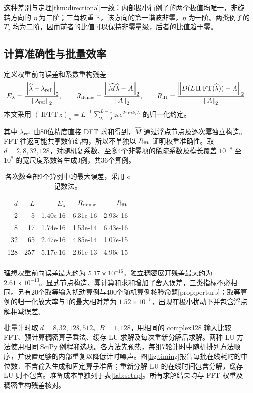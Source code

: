 \documentclass[UTF8,a4paper,zihao=-4,fontset=windows]{ctexart}
\theoremstyle{chinese}
\numberwithin{equation}{section}
\newcommand{\e}{e}\newcommand{\ii}{\mathrm i}
\newcommand{\norm}[1]{\left\lVert#1\right\rVert_2}
\begin{document}
这种差别与定理\ref{thm:directional}一致：内部极小行例子的两个极值均唯一，非旋转方向的 $\eta$ 为二阶；三角权重下，该方向的第一谐波非零，$\eta$ 为一阶。两类例子的 $T_j$ 均为二阶，因而前者的比值可以保持非零量级，后者的比值趋于零。

\subsection{计算准确性与批量效率}
定义权重前向误差和系数重构残差
\begin{equation}\label{eq:metrics}
E_\lambda=\frac{\norm{\widehat\lambda-\lambda_{\rm ref}}}{\norm{\lambda_{\rm ref}}},\qquad
R_{\rm dense}=\frac{\norm{\widehat M\widehat\lambda-A}}{\norm A},\qquad
R_{\rm fft}=\frac{\norm{D(L\operatorname{IFFT}(\widehat\lambda))-A}}{\norm A}.
\end{equation}
本文采用 $(\operatorname{IFFT}z)_n=L^{-1}\sum_{k=0}^{L-1}z_k\e^{2\pi\ii nk/L}$ 的归一化约定。

其中 $\lambda_{\rm ref}$ 由80位精度直接 DFT 求和得到，$\widehat M$ 通过浮点节点及逐次幂独立构造。FFT 往返可能共享数值结构，所以不单独以 $R_{\rm fft}$ 证明权重准确性。取 $d=2,8,32,128$，对随机复系数、至多4个非零项的稀疏系数及模长覆盖 $10^{-8}$ 至 $10^8$ 的宽尺度系数各生成3例，共36个算例。

\begin{table}[htbp]\centering\small
\caption{各次数全部9个算例中的最大误差，采用 e 记数法。}\label{tab:accuracy}
\begin{tabular}{rrrrr}\toprule
$d$ & $L$ & $E_\lambda$ & $R_{\rm dense}$ & $R_{\rm fft}$\\\midrule
2 & 5 & 1.40e-16 & 6.31e-16 & 2.93e-16 \\
8 & 17 & 1.74e-16 & 1.53e-14 & 6.43e-16 \\
32 & 65 & 2.47e-16 & 4.85e-14 & 1.07e-15 \\
128 & 257 & 5.17e-16 & 2.61e-13 & 4.96e-15 \\
\\[-.8em]\bottomrule\end{tabular}
\end{table}

理想权重前向误差最大约为 $5.17\times10^{-16}$，独立稠密展开残差最大约为 $2.61\times10^{-13}$。显式节点构造、幂计算和求和增加了舍入误差，三类指标不必相同。另有20个取等输入扰动算例与400个随机算例核验命题\ref{prop:perturb}；取等算例的归一化放大率与1的最大相对差为 $1.52\times10^{-5}$，出现在极小扰动下并包含浮点解相减误差。

批量计时取 $d=8,32,128,512$、$B=1,128$，用相同的 complex128 输入比较 FFT、预计算稠密算子乘法、缓存 LU 求解及每次重新分解后求解。两种 LU 方法使用相同 SciPy 例程和选项。各方法先预热，每组7轮计时中随机排列方法顺序，并设置足够的内部重复以降低计时噪声。图\ref{fig:timing}报告每批在线耗时的中位数，不含输入生成和固定算子准备；重新分解 LU 的在线时间包含分解，缓存 LU 则不包含。准备成本单独列于表\ref{tab:setup}。所有求解结果均与 FFT 权重及稠密重构残差核对。
\end{document}

